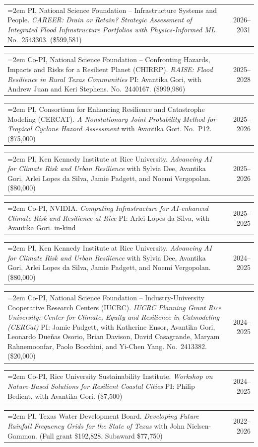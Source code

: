\documentclass[10pt,oneside]{article}
\makeatletter
\newenvironment{alignedentrieshang}[1][2em]{%
  \noindent%
}{%
}
\newcommand{\hangingitem}[2]{%
  \noindent%
  \begin{tabular*}{\textwidth}{@{}p{0.85\textwidth}@{\extracolsep{\fill}}r@{}}%
    \hangindent=2em \hangafter=1 #1 & #2%
  \end{tabular*}%
}
\makeatother
\begin{document}
\begin{alignedentrieshang}


\hangingitem{PI, National Science Foundation -- Infrastructure Systems and People. \textit{CAREER: Drain or Retain? Strategic Assessment of Integrated Flood Infrastructure Portfolios with Physics-Informed ML}. No.\ 2543303. (\$599,581)}{2026--2031}


\hangingitem{Co-PI, National Science Foundation -- Confronting Hazards, Impacts and Risks for a Resilient Planet (CHIRRP). \textit{RAISE: Flood Resilience in Rural Texas Communities} PI: Avantika Gori, with Andrew Juan and Keri Stephens. No.\ 2440167. (\$999,986)}{2025--2028}


\hangingitem{PI, Consortium for Enhancing Resilience and Catastrophe Modeling (CERCAT). \textit{A Nonstationary Joint Probability Method for Tropical Cyclone Hazard Assessment} with Avantika Gori. No.\ P12. (\$75,000)}{2025--2026}


\hangingitem{PI, Ken Kennedy Institute at Rice University. \textit{Advancing AI for Climate Risk and Urban Resilience} with Sylvia Dee, Avantika Gori, Arlei Lopes da Silva, Jamie Padgett, and Noemi Vergopolan. (\$80,000)}{2025--2026}


\hangingitem{Co-PI, NVIDIA. \textit{Computing Infrastructure for AI-enhanced Climate Risk and Resilience at Rice} PI: Arlei Lopes da Silva, with Avantika Gori. in-kind}{2025--2025}


\hangingitem{PI, Ken Kennedy Institute at Rice University. \textit{Advancing AI for Climate Risk and Urban Resilience} with Sylvia Dee, Avantika Gori, Arlei Lopes da Silva, Jamie Padgett, and Noemi Vergopolan. (\$80,000)}{2024--2025}


\hangingitem{Co-PI, National Science Foundation -- Industry-University Cooperative Research Centers (IUCRC). \textit{IUCRC Planning Grant Rice University: Center for Climate, Equity and Resilience in Catmodeling (CERCat)} PI: Jamie Padgett, with Katherine Ensor, Avantika Gori, Leonardo Dueñas Osorio, Brian Davison, David Casagrande, Maryam Rahnemoonfar, Paolo Bocchini, and Yi-Chen Yang. No.\ 2413382. (\$20,000)}{2024--2025}


\hangingitem{Co-PI, Rice University Sustainability Institute. \textit{Workshop on Nature-Based Solutions for Resilient Coastal Cities} PI: Philip Bedient, with Avantika Gori. (\$7,500)}{2024--2025}


\hangingitem{PI, Texas Water Development Board. \textit{Developing Future Rainfall Frequency Grids for the State of Texas} with John Nielsen-Gammon. (Full grant \$192,828. Subaward \$77,750)}{2022--2026}



\end{alignedentrieshang}
\end{document}
